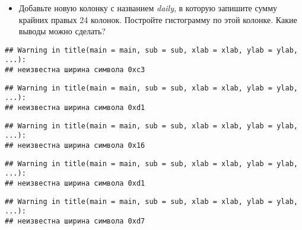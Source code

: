 \documentclass[]{article}
\newenvironment{Shaded}{\begin{snugshade}}{\end{snugshade}}
\newcommand{\KeywordTok}[1]{\textcolor[rgb]{0.13,0.29,0.53}{\textbf{#1}}}
\newcommand{\DataTypeTok}[1]{\textcolor[rgb]{0.13,0.29,0.53}{#1}}
\newcommand{\StringTok}[1]{\textcolor[rgb]{0.31,0.60,0.02}{#1}}
\newcommand{\OperatorTok}[1]{\textcolor[rgb]{0.81,0.36,0.00}{\textbf{#1}}}
\newcommand{\NormalTok}[1]{#1}
\providecommand{\tightlist}{%
  \setlength{\itemsep}{0pt}\setlength{\parskip}{0pt}}
\begin{document}
\begin{itemize}
\tightlist
\item
  Добавьте новую колонку с названием \emph{daily}, в которую запишите
  сумму крайних правых 24 колонок. Постройте гистограмму по этой
  колонке. Какие выводы можно сделать?
\end{itemize}

\begin{Shaded}
\end{Shaded}

\begin{verbatim}
## Warning in title(main = main, sub = sub, xlab = xlab, ylab = ylab, ...):
## неизвестна ширина символа 0xc3
\end{verbatim}

\begin{verbatim}
## Warning in title(main = main, sub = sub, xlab = xlab, ylab = ylab, ...):
## неизвестна ширина символа 0xd1
\end{verbatim}

\begin{verbatim}
## Warning in title(main = main, sub = sub, xlab = xlab, ylab = ylab, ...):
## неизвестна ширина символа 0x16
\end{verbatim}

\begin{verbatim}
## Warning in title(main = main, sub = sub, xlab = xlab, ylab = ylab, ...):
## неизвестна ширина символа 0xd1
\end{verbatim}

\begin{verbatim}
## Warning in title(main = main, sub = sub, xlab = xlab, ylab = ylab, ...):
## неизвестна ширина символа 0xd7
\end{verbatim}
\end{document}
